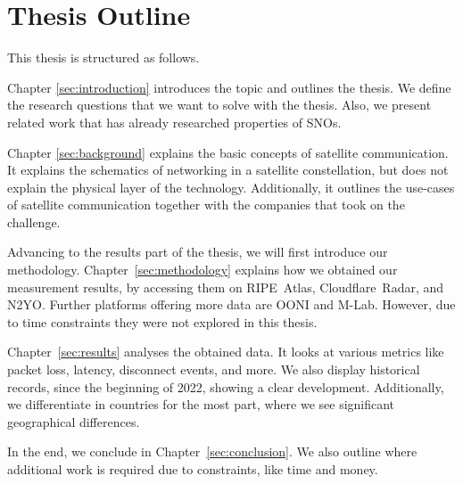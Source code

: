 \section{Thesis Outline}

This thesis is structured as follows.

Chapter \ref{sec:introduction} introduces the topic and outlines the thesis. We
define the research questions that we want to solve with the thesis. Also, we
present related work that has already researched properties of \ac{SNOs}.

Chapter \ref{sec:background} explains the basic concepts of satellite
communication. It explains the schematics of networking in a satellite
constellation, but does not explain the physical layer of the technology.
Additionally, it outlines the use-cases of satellite communication together
with the companies that took on the challenge.

Advancing to the results part of the thesis, we will first introduce our
methodology. Chapter~\ref{sec:methodology} explains how we obtained our
measurement results, by accessing them on RIPE~Atlas, Cloudflare~Radar, and
N2YO. Further platforms offering more data are OONI and M-Lab. However, due to
time constraints they were not explored in this thesis.

Chapter~\ref{sec:results} analyses the obtained data. It looks at various
metrics like packet loss, latency, disconnect events, and more. We also display
historical records, since the beginning of 2022, showing a clear development.
Additionally, we differentiate in countries for the most part, where we see
significant geographical differences.

In the end, we conclude in Chapter~\ref{sec:conclusion}. We also outline where
additional work is required due to constraints, like time and money.

